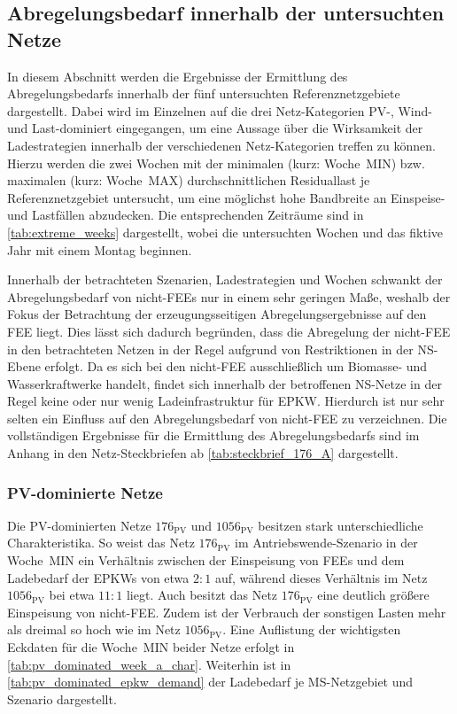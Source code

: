 \subsection{Abregelungsbedarf innerhalb der untersuchten Netze}\label{chap:cur_results}

In diesem Abschnitt werden die Ergebnisse der Ermittlung des Abregelungsbedarfs innerhalb der fünf untersuchten Referenznetzgebiete dargestellt.
Dabei wird im Einzelnen auf die drei Netz-Kategorien \gls{PV}-, Wind- und Last-dominiert eingegangen, um eine Aussage über die Wirksamkeit der Ladestrategien innerhalb der verschiedenen Netz-Kategorien treffen zu können.
Hierzu werden die zwei Wochen mit der minimalen (kurz: Woche~MIN) bzw. maximalen (kurz: Woche~MAX) durchschnittlichen Residuallast je Referenznetzgebiet untersucht, um eine möglichst hohe Bandbreite an Einspeise- und Lastfällen abzudecken.
Die entsprechenden Zeiträume sind in \autoref{tab:extreme_weeks} dargestellt, wobei die untersuchten Wochen und das fiktive Jahr mit einem Montag beginnen.



Innerhalb der betrachteten Szenarien, Ladestrategien und Wochen schwankt der Abregelungsbedarf von nicht-\glspl{FEE} nur in einem sehr geringen Maße, weshalb der Fokus der Betrachtung der erzeugungsseitigen Abregelungsergebnisse auf den \gls{FEE} liegt.
Dies lässt sich dadurch begründen, dass die Abregelung der nicht-\gls{FEE} in den betrachteten Netzen in der Regel aufgrund von Restriktionen in der \gls{NS}-Ebene erfolgt.
Da es sich bei den nicht-\gls{FEE} ausschließlich um Biomasse- und Wasserkraftwerke handelt, findet sich innerhalb der betroffenen \gls{NS}-Netze in der Regel keine oder nur wenig Ladeinfrastruktur für \gls{EPKW}.
Hierdurch ist nur sehr selten ein Einfluss auf den Abregelungsbedarf von nicht-\gls{FEE} zu verzeichnen.
Die vollständigen Ergebnisse für die Ermittlung des Abregelungsbedarfs sind im Anhang in den Netz-Steckbriefen ab \autoref{tab:steckbrief_176_A} dargestellt.


\subsubsection{PV-dominierte Netze}

Die \gls{PV}-dominierten Netze \(176_{\text{PV}}\) und \(1056_{\text{PV}}\) besitzen stark unterschiedliche Charakteristika.
So weist das Netz \(176_{\text{PV}}\) im Antriebswende-Szenario in der Woche~MIN ein Verhältnis zwischen der Einspeisung von \glspl{FEE} und dem Ladebedarf der \glspl{EPKW} von etwa \(2:1\) auf, während dieses Verhältnis im Netz \(1056_{\text{PV}}\) bei etwa \(11:1\) liegt.
Auch besitzt das Netz \(176_{\text{PV}}\) eine deutlich größere Einspeisung von nicht-\gls{FEE}.
Zudem ist der Verbrauch der sonstigen Lasten mehr als dreimal so hoch wie im Netz \(1056_{\text{PV}}\).
Eine Auflistung der wichtigsten Eckdaten für die Woche~MIN beider Netze erfolgt in \autoref{tab:pv_dominated_week_a_char}.
Weiterhin ist in \autoref{tab:pv_dominated_epkw_demand} der Ladebedarf je \gls{MS}-Netzgebiet und Szenario dargestellt.

